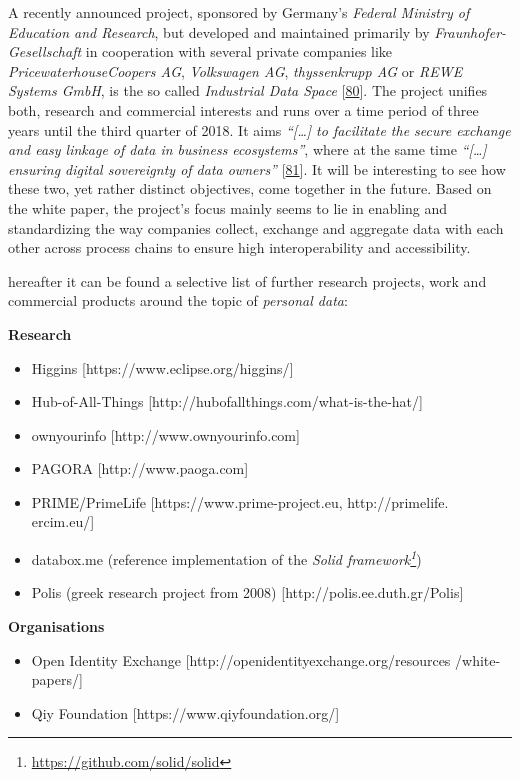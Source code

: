 \documentclass[12pt,english,a4paper,titlepage,cleardoublepage=empty,dottedtoc]{report}
\renewcommand{\href}[2]{#2\footnote{\url{#1}}}
\providecommand{\tightlist}{%
  \setlength{\itemsep}{0pt}\setlength{\parskip}{0pt}}
\begin{document}
A recently announced project, sponsored by Germany's \emph{Federal
Ministry of Education and Research}, but developed and maintained
primarily by \emph{Fraunhofer-Gesellschaft} in cooperation with several
private companies like \emph{PricewaterhouseCoopers AG},
\emph{Volkswagen AG}, \emph{thyssenkrupp AG} or \emph{REWE Systems
GmbH}, is the so called \emph{Industrial Data Space}
{[}\protect\hyperlink{ref-web_industrial-data-space}{80}{]}. The project
unifies both, research and commercial interests and runs over a time
period of three years until the third quarter of 2018. It aims
\emph{``{[}\ldots{}{]} to facilitate the secure exchange and easy
linkage of data in business ecosystems''}, where at the same time
\emph{``{[}\ldots{}{]} ensuring digital sovereignty of data owners''}
{[}\protect\hyperlink{ref-whitepaper_2016_industrial-data-space}{81}{]}.
It will be interesting to see how these two, yet rather distinct
objectives, come together in the future. Based on the white paper, the
project's focus mainly seems to lie in enabling and standardizing the
way companies collect, exchange and aggregate data with each other
across process chains to ensure high interoperability and accessibility.

hereafter it can be found a selective list of further research projects,
work and commercial products around the topic of \emph{personal data}:

\textbf{Research}

\begin{itemize}
\tightlist
\item
  Higgins {[}https://www.eclipse.org/higgins/{]}
\item
  Hub-of-All-Things {[}http://hubofallthings.com/what-is-the-hat/{]}
\item
  ownyourinfo {[}http://www.ownyourinfo.com{]}
\item
  PAGORA {[}http://www.paoga.com{]}
\item
  PRIME/PrimeLife {[}https://www.prime-project.eu, http://primelife.
  ercim.eu/{]}
\item
  databox.me (reference implementation of the
  \emph{\href{https://github.com/solid/solid}{Solid framework}})
\item
  Polis (greek research project from 2008)
  {[}http://polis.ee.duth.gr/Polis{]}
\end{itemize}

\textbf{Organisations}

\begin{itemize}
\tightlist
\item
  Open Identity Exchange {[}http://openidentityexchange.org/resources
  /white-papers/{]}
\item
  Qiy Foundation {[}https://www.qiyfoundation.org/{]}
\end{itemize}
\end{document}
